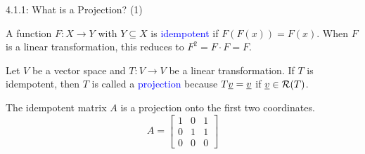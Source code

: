 \documentclass[10pt,english,aspectratio=169]{beamer}
\begin{document}
\begin{frame}{4.1.1: What is a Projection? (1)}

\begin{definition}
A function $F \colon X \rightarrow Y$ with $Y \subseteq X$ is \textcolor{blue}{idempotent} if $F(F(x))=F(x)$.  When $F$ is a linear transformation, this reduces to $F^2 = F \cdot F = F$.
\end{definition}

\begin{definition}
Let $V$ be a vector space and $T \colon V \rightarrow V$ be a linear transformation.
If $T$ is idempotent, then $T$ is called a \textcolor{blue}{projection} because $T\underline{v} = \underline{v}$ if $\underline{v} \in \mathcal{R}(T)$.
\end{definition}

\begin{example}
The idempotent matrix $A$ is a projection onto the first two coordinates. \vspace{-2mm}
\begin{equation*}
A = \begin{bmatrix}
1 & 0 & 1 \\
0 & 1 & 1 \\
0 & 0 & 0
\end{bmatrix}
\end{equation*}
\end{example}

\end{frame}
\end{document}

